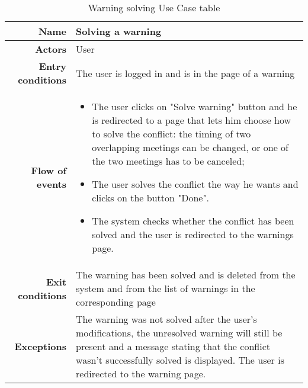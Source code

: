 \begin{table}[htp]
\begin{tabular}{r|p{7cm}}

\bf\large Name&\bf\large Solving a warning\\
\hline
\hline
\bf Actors&User\\
\hline
\bf Entry conditions&The user is logged in and is in the page of a warning\\
\hline
\bf Flow of events&
\begin{itemize}
\item The user clicks on "Solve warning" button and he is redirected to a page that lets him
choose how to solve the conflict: the timing of two overlapping meetings can be changed, or one of the two meetings has to be canceled; 
\item  The user solves the conflict the way he wants and clicks on the button "Done".
\item  The system checks whether the conflict has been solved and the user is redirected to the warnings page.
\end{itemize}
\\
\hline
\bf Exit conditions&The warning has been solved and is deleted from the system and from the list of warnings in the corresponding page\\
\hline
\bf Exceptions&The warning was not solved after the user's modifications, the unresolved warning will still be present and a message stating that the conflict wasn't successfully solved is displayed. The user is redirected to the warning page.
\\
\hline

\end{tabular}
\caption{Warning solving Use Case table} 
\label{tab:warningsolving}
\end{table}